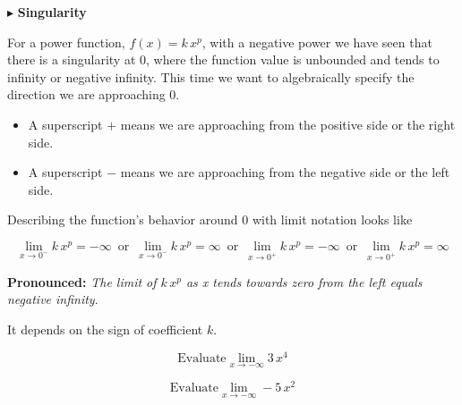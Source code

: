 \documentclass{ximera}
\begin{document}
$\blacktriangleright$  \textbf{Singularity}



For a power function, $f(x) = k \, x^p$, with a negative power we have seen that there is a singularity at $0$, where the function value is unbounded and tends to infinity or negative infinity.  This time we want to algebraically specify the direction we are approaching $0$.  

\begin{itemize}
\item A superscript $+$ means we are approaching from the positive side or the right side.
\item A superscript $-$ means we are approaching from the negative side or the left side.
\end{itemize}


Describing the function's behavior around $0$ with limit notation looks like




\[    \lim_{x \to 0^-} k \, x^p =  -\infty  \,   \text{ or }  \,     \lim_{x \to 0^-} k \, x^p = \infty   \,   \text{ or }  \,      \lim_{x \to 0^+} k \, x^p =  -\infty  \,   \text{ or }  \,     \lim_{x \to 0^+} k \, x^p = \infty   \]




\textbf{\textcolor{blue!55!black}{Pronounced:}} \textit{The limit of $k \, x^p$ as x tends towards zero from the left equals negative infinity}.

It depends on the sign of coefficient $k$.









\begin{question}

\[ \text{Evaluate} \lim_{x \to -\infty} 3 \, x^4 \]

\begin{multipleChoice}
\choice {$-\infty$}
\choice [correct]{$\infty$}
\end{multipleChoice}
\end{question}






\begin{question}

\[ \text{Evaluate} \lim_{x \to -\infty} -5 \, x^2 \]

\begin{multipleChoice}
\choice [correct]{$-\infty$}
\choice {$\infty$}
\end{multipleChoice}
\end{question}
\end{document}
